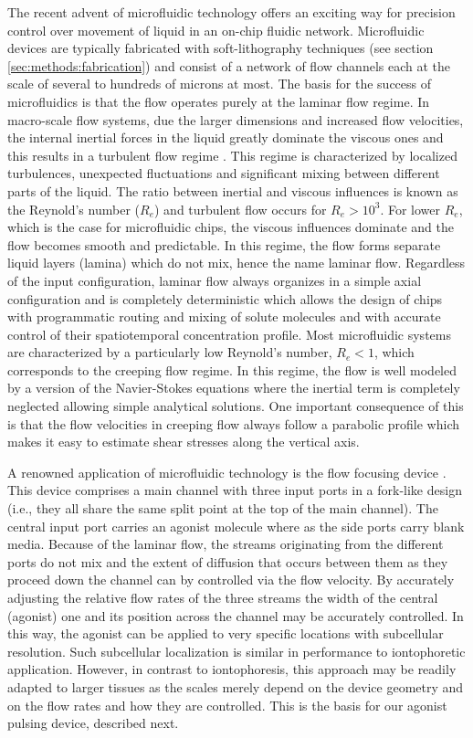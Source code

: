     The recent advent of microfluidic technology offers an exciting way for precision control over movement of liquid in an on-chip fluidic network. Microfluidic devices are typically fabricated with soft-lithography techniques (see section \ref{sec:methods:fabrication}) and consist of a network of flow channels each at the scale of several to hundreds of microns at most. The basis for the success of microfluidics is that the flow operates purely at the laminar flow regime. In macro-scale flow systems, due the larger dimensions and increased flow velocities, the internal inertial forces in the liquid greatly dominate the viscous ones and this results in a turbulent flow regime \cite{fluidBook}. This regime is characterized by localized turbulences, unexpected fluctuations and significant mixing between different parts of the liquid. The ratio between inertial and viscous influences is known as the Reynold's number (\(R_{e}\)) and turbulent flow occurs for \(R_{e}>10^{3}\). For lower \(R_{e}\), which is the case for microfluidic chips, the viscous influences dominate and the flow becomes smooth and predictable. In this regime, the flow forms separate liquid layers (lamina) which do not mix, hence the name laminar flow. Regardless of the input configuration, laminar flow always organizes in a simple axial configuration and is completely deterministic which allows the design of chips with programmatic routing and mixing of solute molecules and with accurate control of their spatiotemporal concentration profile. Most microfluidic systems are characterized by a particularly low Reynold's number, \(R_{e}<1\), which corresponds to the creeping flow regime. In this regime, the flow is well modeled by a version of the Navier-Stokes equations where the inertial term is completely neglected allowing simple analytical solutions. One important consequence of this is that the flow velocities in creeping flow always follow a parabolic profile which makes it easy to estimate shear stresses along the vertical axis.

    A renowned application of microfluidic technology is the flow focusing device \cite{takayama2001laminar}. This device comprises a main channel with three input ports in a fork-like design (i.e., they all share the same split point at the top of the main channel). The central input port carries an agonist molecule where as the side ports carry blank media. Because of the laminar flow, the streams originating from the different ports do not mix and the extent of diffusion that occurs between them as they proceed down the channel can by controlled via the flow velocity. By accurately adjusting the relative flow rates of the three streams the width of the central (agonist) one and its position across the channel may be accurately controlled. In this way, the agonist can be applied to very specific locations with subcellular resolution. Such subcellular localization is similar in performance to iontophoretic application. However, in contrast to iontophoresis, this approach may be readily adapted to larger tissues as the scales merely depend on the device geometry and on the flow rates and how they are controlled. This is the basis for our agonist pulsing device, described next.

